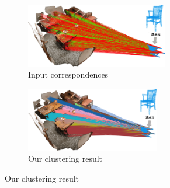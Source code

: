     \begin{figure}[ht]
        \centering
        \begin{subfigure}{0.4\textwidth}
            \centering
            \includegraphics[height=2.8cm]{images/scan2cad-cad-input-corrs1.png}
              \caption{Input correspondences}
              \label{fig:scan2cad_cad-input-corrs1}
          \end{subfigure}
          \begin{subfigure}{0.45\textwidth}
            \centering
            \includegraphics[height=2.8cm]{images/scan2cad-cad-cluster-corrs1.png}
              \caption{Our clustering result}
              \label{fig:scan2cad_cad-cluster-corrs1}
          \end{subfigure}
    

\end{figure}

